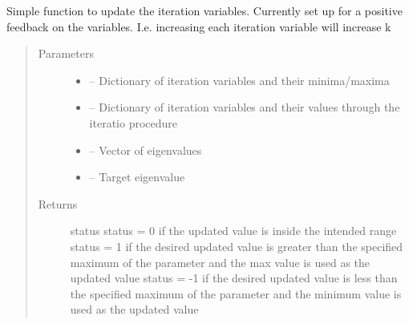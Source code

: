\documentclass[letterpaper,10pt,english]{sphinxmanual}
\begin{document}

\begin{fulllineitems}
\label{\detokenize{iterator:critops.iterator.update_itervar}}
Simple function to update the iteration variables.
Currently set up for a positive feedback on the variables.
I.e. increasing each iteration variable will increase k
\begin{quote}\begin{description}
\item[{Parameters}] \leavevmode\begin{itemize}
\item {} 
 -- Dictionary of iteration variables and their minima/maxima

\item {} 
 -- Dictionary of iteration variables and their values through the iteratio procedure

\item {} 
 -- Vector of eigenvalues

\item {} 
 -- Target eigenvalue

\end{itemize}

\item[{Returns}] \leavevmode
status
status = 0 if the updated value is inside the intended range
status = 1 if the desired updated value is greater than the specified maximum of the parameter
and the max value is used as the updated value
status = -1 if the desired updated value is less than the specified maximum of the parameter
and the minimum value is used as the updated value

\end{description}\end{quote}

\end{fulllineitems}

\end{document}

